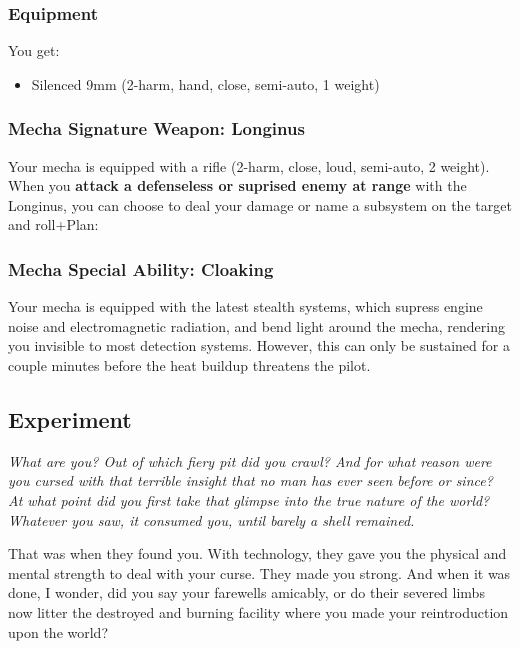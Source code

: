 
\subsubsection{Equipment}
You get:
\begin{itemize}
\item Silenced 9mm (2-harm, hand, close, semi-auto, 1 weight)
\end{itemize}

\subsubsection{Mecha Signature Weapon: Longinus}
Your mecha is equipped with a rifle (2-harm, close, loud, semi-auto, 2 weight). When you \textbf{attack a defenseless or suprised enemy at range} with the Longinus, you can choose to deal your damage or name a subsystem on the target and roll+Plan:

\subsubsection{Mecha Special Ability: Cloaking}
Your mecha is equipped with the latest stealth systems, which supress engine noise and electromagnetic radiation, and bend light around the mecha, rendering you invisible to most detection systems. However, this can only be sustained for a couple minutes before the heat buildup threatens the pilot.



\subsection{Experiment}
{\itshape What \emph{are} you? Out of which fiery pit did you crawl?
  And for what reason were you cursed with that terrible insight that
  no man has ever seen before or since? At what point did you first
  take that glimpse into the true nature of the world?  Whatever you
  saw, it consumed you, until barely a shell remained.

That was when they found you. With technology, they gave you the
physical and mental strength to deal with your curse. They made you
strong. And when it was done, I wonder, did you say your farewells
amicably, or do their severed limbs now litter the destroyed and
burning facility where you made your reintroduction upon the world?}

